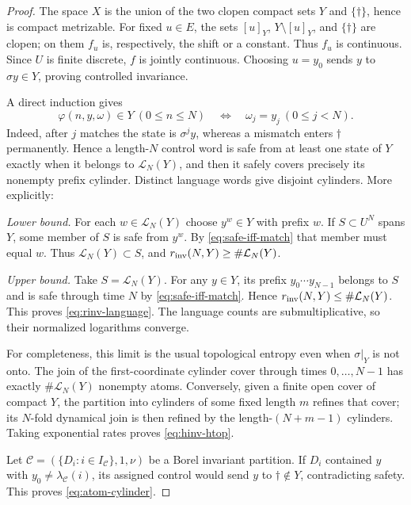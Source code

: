 \documentclass[11pt,reqno]{amsart}
\numberwithin{equation}{section}
\theoremstyle{definition}
\newcommand{\C}{\mathcal C}
\newcommand{\Lcal}{\mathcal L}
\begin{document}
\begin{proof}
The space $X$ is the union of the two clopen compact sets $Y$ and
$\{\dagger\}$, hence is compact metrizable.  For fixed $u\in E$, the sets
$[u]_Y$, $Y\setminus[u]_Y$, and $\{\dagger\}$ are clopen; on them $f_u$ is,
respectively, the shift or a constant.  Thus $f_u$ is continuous.  Since $U$
is finite discrete, $f$ is jointly continuous.  Choosing $u=y_0$ sends $y$
to $\sigma y\in Y$, proving controlled invariance.

A direct induction gives
\begin{equation}\label{eq:safe-iff-match}
 \varphi(n,y,\omega)\in Y\ (0\le n\le N)
 \quad\Longleftrightarrow\quad
 \omega_j=y_j\ (0\le j<N).
\end{equation}
Indeed, after $j$ matches the state is $\sigma^j y$, whereas a mismatch enters
$\dagger$ permanently.  Hence a length-$N$ control word is safe from at
least one state of $Y$ exactly when it belongs to $\Lcal_N(Y)$, and then it
safely covers precisely its nonempty prefix cylinder.  Distinct language
words give disjoint cylinders. More explicitly:

\emph{Lower bound.} For each $w\in\Lcal_N(Y)$ choose $y^w\in Y$
with prefix $w$. If $S\subset U^N$ spans $Y$, some member of $S$ is safe
from $y^w$. By \eqref{eq:safe-iff-match} that member must equal $w$.
Thus $\Lcal_N(Y)\subset S$, and
$r_{\rm inv}(N,Y)\ge\#\Lcal_N(Y)$.

\emph{Upper bound.} Take $S=\Lcal_N(Y)$. For any $y\in Y$, its
prefix $y_0\cdots y_{N-1}$ belongs to $S$ and is safe through time $N$
by \eqref{eq:safe-iff-match}. Hence
$r_{\rm inv}(N,Y)\le\#\Lcal_N(Y)$.
This proves \eqref{eq:rinv-language}.  The language counts are
submultiplicative, so their normalized logarithms converge.

For completeness, this limit is the usual topological entropy even when
$\sigma|_Y$ is not onto.  The join of the first-coordinate cylinder cover
through times $0,\ldots,N-1$ has exactly $\#\Lcal_N(Y)$ nonempty atoms.
Conversely, given a finite open cover of compact $Y$, the partition into
cylinders of some fixed length $m$ refines that cover; its $N$-fold dynamical join is
then refined by the length-$(N+m-1)$ cylinders.  Taking exponential rates proves
\eqref{eq:hinv-htop}.

Let $\C=(\{D_i:i\in I_\C\},1,\nu)$ be a Borel invariant partition.  If
$D_i$ contained $y$ with $y_0\ne\lambda_\C(i)$, its assigned control would send $y$ to
$\dagger\notin Y$, contradicting safety.  This proves
\eqref{eq:atom-cylinder}.


\end{proof}
\end{document}
